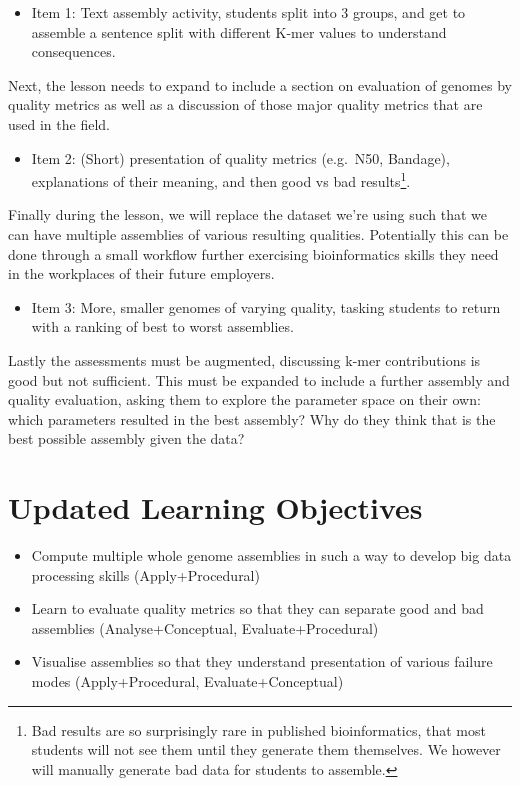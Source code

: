 \documentclass[paper=a4,justified,a4paper]{tufte-handout}
\providecommand{\tightlist}{%
  \setlength{\itemsep}{0pt}\setlength{\parskip}{0pt}}
\begin{document}
\begin{itemize}
\tightlist
\item
  Item 1: Text assembly activity, students split into 3 groups, and get
  to assemble a sentence split with different K-mer values to understand
  consequences.
\end{itemize}

Next, the lesson needs to expand to include a section on evaluation of
genomes by quality metrics as well as a discussion of those major
quality metrics that are used in the field.

\begin{itemize}
\tightlist
\item
  Item 2: (Short) presentation of quality metrics (e.g.~N50, Bandage),
  explanations of their meaning, and then good vs bad results\footnote{Bad
    results are so surprisingly rare in published bioinformatics, that
    most students will not see them until they generate them themselves.
    We however will manually generate bad data for students to assemble.}.
\end{itemize}

Finally during the lesson, we will replace the dataset we're using such
that we can have multiple assemblies of various resulting qualities.
Potentially this can be done through a small workflow further exercising
bioinformatics skills they need in the workplaces of their future
employers.

\begin{itemize}
\tightlist
\item
  Item 3: More, smaller genomes of varying quality, tasking students to
  return with a ranking of best to worst assemblies.
\end{itemize}

Lastly the assessments must be augmented, discussing k-mer contributions
is good but not sufficient. This must be expanded to include a further
assembly and quality evaluation, asking them to explore the parameter
space on their own: which parameters resulted in the best assembly? Why
do they think that is the best possible assembly given the data?

\hypertarget{updated-learning-objectives}{%
\section{Updated Learning
Objectives}\label{updated-learning-objectives}}

\begin{itemize}
\tightlist
\item
  Compute multiple whole genome assemblies in such a way to develop big
  data processing skills (Apply+Procedural)
\item
  Learn to evaluate quality metrics so that they can separate good and
  bad assemblies (Analyse+Conceptual, Evaluate+Procedural)
\item
  Visualise assemblies so that they understand presentation of various
  failure modes (Apply+Procedural, Evaluate+Conceptual)
\end{itemize}
\end{document}
